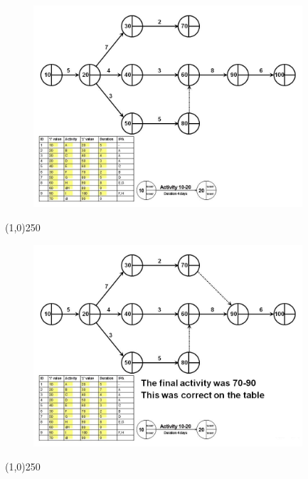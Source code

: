 \begin{frame}
\begin{figure}
	\centering
		\includegraphics[width = 10.0cm]{oldnotes/Slide100.jpg}
\end{figure}
\end{frame}
\begin{center}\line(1,0){250}\end{center}


\begin{frame}
\begin{figure}
	\centering
		\includegraphics[width = 10.0cm]{oldnotes/Slide101.jpg}
\end{figure}
\end{frame}
\begin{center}\line(1,0){250}\end{center}


